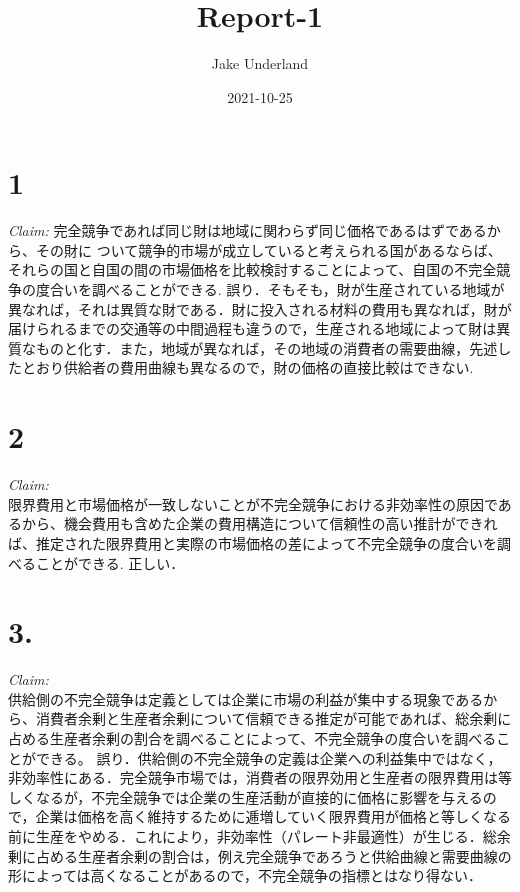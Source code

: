 \documentclass[
]{ltjarticle}
\title{Report-1}
\author{Jake Underland}
\date{2021-10-25}
\begin{document}
\maketitle

{
\setcounter{tocdepth}{3}
\tableofcontents
}
\hypertarget{section}{%
\section{1}\label{section}}

\textit{Claim:}
完全競争であれば同じ財は地域に関わらず同じ価格であるはずであるから、その財に
ついて競争的市場が成立していると考えられる国があるならば、それらの国と自国の間の市場価格を比較検討することによって、自国の不完全競争の度合いを調べることができる.
\newline \newline
誤り．そもそも，財が生産されている地域が異なれば，それは異質な財である．財に投入される材料の費用も異なれば，財が届けられるまでの交通等の中間過程も違うので，生産される地域によって財は異質なものと化す．また，地域が異なれば，その地域の消費者の需要曲線，先述したとおり供給者の費用曲線も異なるので，財の価格の直接比較はできない.

\hypertarget{section-1}{%
\section{2}\label{section-1}}

\textit{Claim: }\\
限界費用と市場価格が一致しないことが不完全競争における非効率性の原因であるから、機会費用も含めた企業の費用構造について信頼性の高い推計ができれば、推定された限界費用と実際の市場価格の差によって不完全競争の度合いを調べることができる.
\newline \newline 正しい．

\hypertarget{section-2}{%
\section{3.}\label{section-2}}

\textit{Claim:}\\
供給側の不完全競争は定義としては企業に市場の利益が集中する現象であるから、消費者余剰と生産者余剰について信頼できる推定が可能であれば、総余剰に占める生産者余剰の割合を調べることによって、不完全競争の度合いを調べることができる。
\newline \newline
誤り．供給側の不完全競争の定義は企業への利益集中ではなく，非効率性にある．完全競争市場では，消費者の限界効用と生産者の限界費用は等しくなるが，不完全競争では企業の生産活動が直接的に価格に影響を与えるので，企業は価格を高く維持するために逓増していく限界費用が価格と等しくなる前に生産をやめる．これにより，非効率性（パレート非最適性）が生じる．総余剰に占める生産者余剰の割合は，例え完全競争であろうと供給曲線と需要曲線の形によっては高くなることがあるので，不完全競争の指標とはなり得ない．
\end{document}
